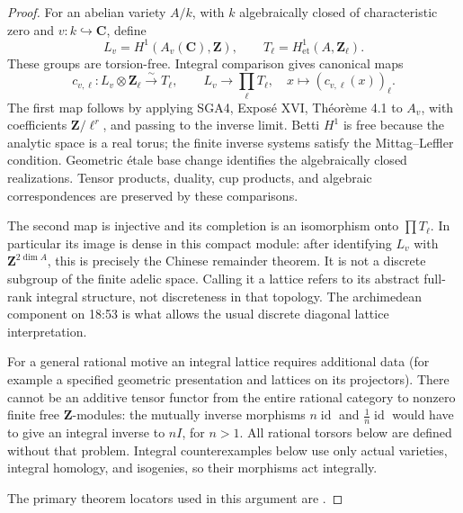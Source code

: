 \begin{proof}
For an abelian variety \(A/k\), with \(k\) algebraically closed of
characteristic zero and \(v:k\hookrightarrow\mathbf C\), define
\[
L_v=H^1(A_v(\mathbf C),\mathbf Z),\qquad
T_\ell=H^1_{\mathrm{et}}(A,\mathbf Z_\ell).
\]
These groups are torsion-free. Integral comparison gives canonical
maps
\[
c_{v,\ell}:L_v\otimes\mathbf Z_\ell\xrightarrow{\sim}T_\ell,
\qquad
L_v\longrightarrow\prod_\ell T_\ell,\quad
x\longmapsto(c_{v,\ell}(x))_\ell.
\tag{D.1.1.1}
\]
The first map follows by applying SGA4, Exposé XVI, Théorème 4.1 to
\(A_v\), with coefficients \(\mathbf Z/\ell^r\), and passing to the
inverse limit. Betti \(H^1\) is free because the analytic space is a
real torus; the finite inverse systems satisfy the Mittag--Leffler
condition. Geometric étale base change identifies the algebraically
closed realizations. Tensor products, duality, cup products, and
algebraic correspondences are preserved by these comparisons.

The second map is injective and its completion is an isomorphism onto
\(\prod T_\ell\). In particular its image is dense in this compact
module: after identifying \(L_v\) with \(\mathbf Z^{2\dim A}\), this
is precisely the Chinese remainder theorem. It is not a discrete
subgroup of the finite adelic space. Calling it a lattice refers to
its abstract full-rank integral structure, not discreteness in that
topology. The archimedean component on 18:53 is what allows the usual
discrete diagonal lattice interpretation.

For a general rational motive an integral lattice requires additional
data (for example a specified geometric presentation and lattices on
its projectors). There cannot be an additive tensor functor from the
entire rational category to nonzero finite free \(\mathbf Z\)-modules:
the mutually inverse morphisms \(n\operatorname{id}\) and
\(\frac1n\operatorname{id}\) would have to give an integral inverse to
\(nI\), for \(n>1\). All rational torsors below are defined without
that problem. Integral counterexamples below use only actual varieties,
integral homology, and isogenies, so their morphisms act integrally.

The primary theorem locators used in this argument are \cite[Expos\'e XVI, Th\'eor\`eme 4.1, original p.233]{GenSGA4}.
\end{proof}

